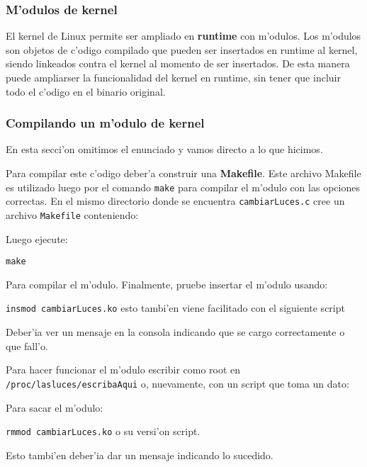 \subsubsection{M'odulos de kernel}

El kernel de Linux permite ser ampliado en \textbf{runtime} con m'odulos. Los m'odulos son objetos de c'odigo compilado
que pueden ser insertados en runtime al kernel, siendo linkeados contra el kernel al momento de ser insertados. De esta
manera puede ampliarser la funcionalidad del kernel en runtime, sin tener que incluir todo el c'odigo en el binario
original.

\subsubsection{Compilando un m'odulo de kernel}

En esta secci'on omitimos el enunciado y vamos directo a lo que hicimos.


Para compilar este c'odigo deber'a construir una \textbf{Makefile}. Este archivo Makefile es utilizado luego por el
comando \texttt{make} para compilar el m'odulo con las opciones correctas. En el mismo directorio donde se encuentra
\texttt{cambiarLuces.c} cree un archivo \texttt{Makefile} conteniendo:


Luego ejecute:

\texttt{make}

Para compilar el m'odulo. Finalmente, pruebe insertar el m'odulo usando:

\texttt{insmod cambiarLuces.ko} esto tambi'en viene facilitado con el siguiente script

Deber'ia ver un mensaje en la consola indicando que se cargo correctamente o que fall'o. 

Para hacer funcionar el m'odulo escribir como root en \texttt{/proc/lasluces/escribaAqui} o, nuevamente, con un script que toma un dato:


Para sacar el m'odulo:

\texttt{rmmod cambiarLuces.ko} o su versi'on script.


Esto tambi'en deber'ia dar un mensaje indicando lo sucedido.

